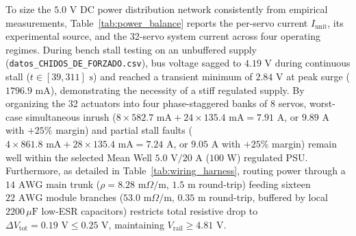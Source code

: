 \documentclass[lettersize,journal]{IEEEtran}
\begin{document}
	To size the $5.0\text{ V}$ DC power distribution network consistently from empirical measurements, Table~\ref{tab:power_balance} reports the per-servo current $I_{\text{unit}}$, its experimental source, and the 32-servo system current across four operating regimes. During bench stall testing on an unbuffered supply (\texttt{datos\_CHIDOS\_DE\_FORZADO.csv}), bus voltage sagged to $4.19\text{ V}$ during continuous stall ($t \in [39, 311]\text{ s}$) and reached a transient minimum of $2.84\text{ V}$ at peak surge ($1796.9\text{ mA}$), demonstrating the necessity of a stiff regulated supply. By organizing the 32 actuators into four phase-staggered banks of 8 servos, worst-case simultaneous inrush ($8 \times 582.7\text{ mA} + 24 \times 135.4\text{ mA} = 7.91\text{ A}$, or $9.89\text{ A}$ with $+25\%$ margin) and partial stall faults ($4 \times 861.8\text{ mA} + 28 \times 135.4\text{ mA} = 7.24\text{ A}$, or $9.05\text{ A}$ with $+25\%$ margin) remain well within the selected Mean Well $5.0\text{ V} / 20\text{ A}$ ($100\text{ W}$) regulated PSU. Furthermore, as detailed in Table~\ref{tab:wiring_harness}, routing power through a $14\text{ AWG}$ main trunk ($\rho = 8.28\text{ m}\Omega/\text{m}$, $1.5\text{ m}$ round-trip) feeding sixteen $22\text{ AWG}$ module branches ($53.0\text{ m}\Omega/\text{m}$, $0.35\text{ m}$ round-trip, buffered by local $2200\,\mu\text{F}$ low-ESR capacitors) restricts total resistive drop to $\Delta V_{\text{tot}} = 0.19\text{ V} \le 0.25\text{ V}$, maintaining $V_{\text{rail}} \ge 4.81\text{ V}$.
	
\end{document}
